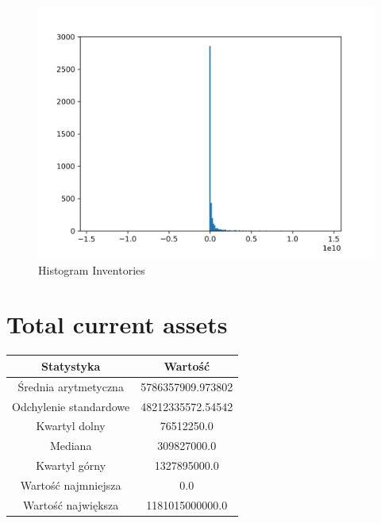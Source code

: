 \documentclass{article}
\begin{document}
\begin{figure}[h!]
    \includegraphics[width=\linewidth]{variables/Inventories.png}
    \caption{Histogram Inventories }
\end{figure}\section{ Total current assets }

\begin{center}
    \begin{tabular}{|c | c|} 
    \hline
    Statystyka & Wartość \\
    \hline\hline
    Średnia arytmetyczna & 5786357909.973802 \\ 
    \hline
    Odchylenie standardowe & 48212335572.54542 \\
    \hline
    Kwartyl dolny & 76512250.0 \\
    \hline
    Mediana & 309827000.0 \\
    \hline
    Kwartyl górny & 1327895000.0 \\
    \hline
    Wartość najmniejsza & 0.0 \\
    \hline
    Wartość największa & 1181015000000.0 \\
    \hline
   \end{tabular}
\end{center}
\end{document}
